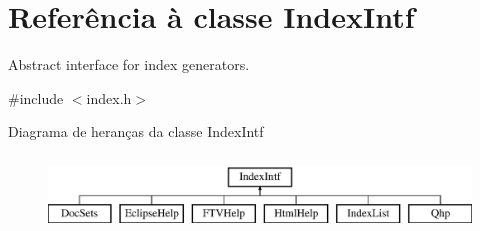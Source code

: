 \hypertarget{class_index_intf}{\section{Referência à classe Index\-Intf}
\label{class_index_intf}
}


Abstract interface for index generators.  




{\ttfamily \#include $<$index.\-h$>$}

Diagrama de heranças da classe Index\-Intf\begin{figure}[H]
\begin{center}
\leavevmode
\includegraphics[height=2.000000cm]{class_index_intf}
\end{center}
\end{figure}
